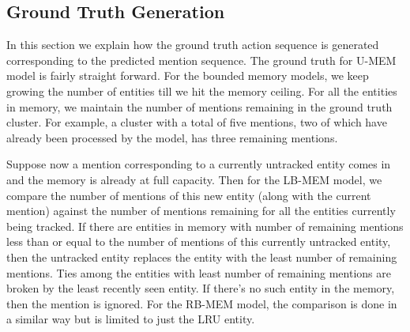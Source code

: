 \documentclass[11pt,a4paper]{article}
\newcommand{\unbounded}{U-MEM\xspace}
\newcommand{\learned}{LB-MEM\xspace}
\newcommand{\lru}{RB-MEM\xspace}
\begin{document}
\begin{table}[t]

\end{table}


\subsection{Ground Truth Generation}
\label{sec:app_gt}
In this section we explain how the ground truth action sequence is generated corresponding to the predicted mention sequence.
The ground truth for \unbounded model is fairly straight forward.
For the bounded memory models, we keep growing the number of entities till we hit the memory ceiling.
For all the entities in memory, we maintain the number of mentions remaining in the ground truth cluster.
For example, a cluster with a total of five mentions, two of which have already been processed by the model, has three remaining mentions.

Suppose now a mention corresponding to a currently untracked entity comes in and the memory is already at full capacity.
Then for the \learned model, we compare the number of mentions of this new entity (along with the current mention) against the number of mentions remaining for all the entities currently being tracked. If there are entities in memory with number of remaining mentions less than or equal to the number of mentions of this currently untracked entity, then the untracked entity replaces the entity with the least number of remaining mentions. Ties among the entities with least number of remaining mentions are broken by the least recently seen entity. If there's no such entity in the memory, then the mention is ignored.
For the \lru model, the comparison is done in a similar way but is limited to just the LRU entity.
\end{document}
